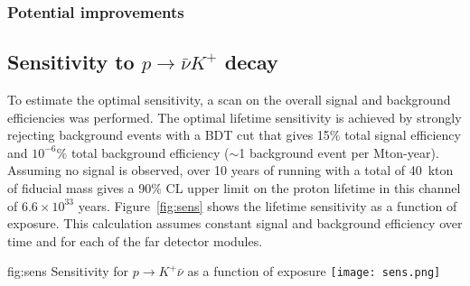 \subsubsection{Potential improvements}



\subsection{Sensitivity to $p\to\bar{\nu}K^+$ decay}
\label{subsec:nonaccel-ndk-nubarkplus}

To estimate the optimal sensitivity, a scan on the overall signal and background efficiencies was performed.  The optimal lifetime sensitivity is achieved by strongly rejecting background events with a BDT cut that gives 15$\%$ total signal efficiency and $10^{-6}\%$ total background efficiency ($\sim$1 background event per Mton-year). Assuming no signal is observed, over 10 years of running with a total of 40~kton of fiducial mass gives a 90$\%$ CL upper limit on the proton lifetime in this channel of $6.6\times10^{33}$ years. Figure~\ref{fig:sens} shows the lifetime sensitivity as a function of exposure. This calculation assumes constant signal and background efficiency over time and for each of the far detector modules. 

\begin{dunefigure}
{fig:sens}
{Sensitivity for $p\rightarrow K^{+} \bar{\nu}$ as a function of exposure}
\texttt{[image: sens.png]}
\end{dunefigure} 

